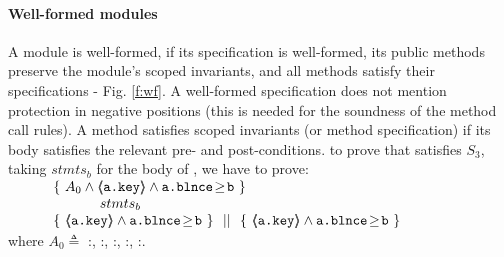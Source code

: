\paragraph{Well-formed modules} A module is well-formed, if  its specification is well-formed,   its public methods preserve   the module's scoped invariants, and  all  methods satisfy their specifications - \cf  Fig.  \ref{f:wf}.
A well-formed  specification  does not mention protection in negative positions (this is needed for the soundness of the method call rules). 
A method satisfies  scoped invariants (or method  specification) if its body satisfies the relevant pre- and post-conditions.
%
%
%
\Eg to prove  that   satisfies {$S_3$}, taking   $stmts_{b}$ %
for the    body of ,  we  have to prove:
\\
$
\begin{array}{ll}
\ \ \ \ \  &   
                     \{ \ {A_0  \wedge  \inside{\prg{a.\password}} \wedge  \prg{a.\balance}\!\geq\!{\prg{b} } } \  \} \\
		& \ \ \ \ \ \ \ \ \ \   stmts_{b} \  \\
		&
                   \{\  {\inside{\prg{a.\password}} \wedge  \prg{a.\balance}\!\geq\!{\prg{b}} }  \ \}\ \  ||\ \  \{\ \inside{\prg{a.\password}}\wedge  \prg{a.\balance}\!\geq\!{\prg{b}}   \ \} 
\end{array}
$
\\
\noindent 
 where $A_0 \triangleq $ %
:, :, :, :,  :.

